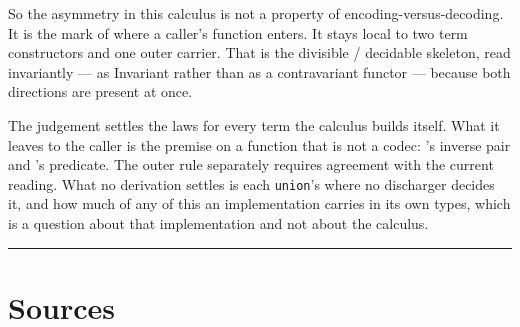 So the asymmetry in this calculus is not a property of encoding-versus-decoding. It is the mark of
where a caller's function enters. It stays local to two term constructors and one outer carrier.
That is the divisible /
decidable \cite{divisible-decidable} skeleton, read invariantly — as Invariant rather than as a
contravariant functor — because both directions are present at once.

The judgement settles the laws for every term the calculus builds itself. What it leaves to the
caller is the premise on a function that is not a codec: 's inverse pair
and 's predicate. The outer
 rule separately requires agreement with the current
reading. What no derivation settles is each
\texttt{union}'s  where no discharger decides it, and how much of any of this an
implementation carries in its own types, which is a question about that implementation and not
about the calculus.

\begin{center}\rule{0.5\linewidth}{0.5pt}\end{center}

\section{Sources}\label{sources}

